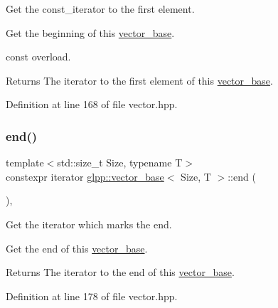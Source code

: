 Get the const\+\_\+iterator to the first element. 

Get the beginning of this \hyperlink{classglpp_1_1vector__base}{vector\+\_\+base}.

{\ttfamily const} overload. 

\begin{DoxyReturn}{Returns}
The iterator to the first element of this \hyperlink{classglpp_1_1vector__base}{vector\+\_\+base}. 
\end{DoxyReturn}


Definition at line 168 of file vector.\+hpp.

\mbox{\label{classglpp_1_1vector__base_a67c0770dcf8747d0119b6c32974caa76}} 
\subsubsection{\texorpdfstring{end()}{end()}\hspace{0.1cm}{\footnotesize\ttfamily [1/2]}}
{\footnotesize\ttfamily template$<$std\+::size\+\_\+t Size, typename T$>$ \\
constexpr iterator \hyperlink{classglpp_1_1vector__base}{glpp\+::vector\+\_\+base}$<$ Size, T $>$\+::end (\begin{DoxyParamCaption}{ }\end{DoxyParamCaption})\hspace{0.3cm}{\ttfamily [inline]}, {\ttfamily [noexcept]}}



Get the iterator which marks the end. 

Get the end of this \hyperlink{classglpp_1_1vector__base}{vector\+\_\+base}.

\begin{DoxyReturn}{Returns}
The iterator to the end of this \hyperlink{classglpp_1_1vector__base}{vector\+\_\+base}. 
\end{DoxyReturn}


Definition at line 178 of file vector.\+hpp.

\mbox{\label{classglpp_1_1vector__base_a684a3f97ac7edfe4ea265a505f70df74}} 
